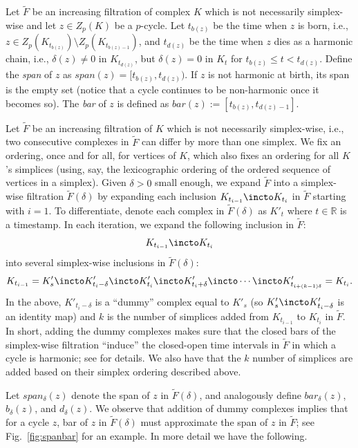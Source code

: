 \begin{definition}\label{dfn:bd-span-bar2}
Let $\tilde{F}$ be an increasing filtration of complex $K$ which is not necessarily simplex-wise and let $z \in Z_p(K)$ be a $p$-cycle. 
Let $t_{b(z)}$ be the time when $z$ is born,  i.e., $z\in Z_p(K_{t_{b(z)}})\setminus Z_p(K_{t_{b(z)-1}})$, and $t_{d(z)}$ be the time when $z$ dies as a harmonic chain, i.e., $\delta(z)\neq 0 $ in $K_{t_{d(z)}}$, but $\delta(z)=0$ in $K_t$ for $t_{b(z)} \leq t < t_{d(z)}$. Define the \emph{span} of $z$ as $span(z)=[t_{b(z)}, t_{d(z)})$.  If $z$ is not harmonic at birth, its span is the empty set (notice that a cycle  continues to be non-harmonic once it becomes so).
    The \emph{bar} of $z$ is defined as $bar(z) := [t_{b(z)}, t_{d(z)-1}]$.
\end{definition}


Let $\tilde{F}$ be an increasing filtration of $K$ which is not necessarily simplex-wise, i.e., two consecutive complexes in $\tilde{F}$ can differ by more than one simplex. We fix an ordering, once and for all, for vertices of $K$, which also fixes an ordering for all $K$'s simplices (using, say, the lexicographic ordering of the ordered sequence of vertices in a simplex). Given $\delta>0$ small enough, 
we expand $\tilde{F}$ into a simplex-wise filtration $\tilde{F}(\delta)$
by  expanding each inclusion $K_{t_{i-1}}\incto K_{t_{i}}$
in $\tilde{F}$
starting with $i=1$.
To differentiate,
 denote each complex in $\tilde{F}(\delta)$
as $K'_t$ where $t\in\mathbb{R}$ is a timestamp.
In each iteration, we expand the following inclusion in $\tilde{F}$:
$$K_{t_{i-1}} \incto K_{t_i} 
$$ 
 into  several simplex-wise inclusions in $\tilde{F}(\delta)$: 
$$  K_{t_{i-1}}=K'_{s} \incto K'_{t_i-\delta} \incto K'_{t_i}\incto K'_{t_i +\delta} \incto \cdots \incto K'_{t_{i+(k-1)\delta}} =K_{t_i}.
$$ 
In the above, $K'_{t_i-\delta}$ is a ``dummy'' complex equal to $K'_{s}$
(so $K'_{s} \incto K'_{t_i-\delta}$ is an identity map)
and $k$ is the number of simplices added from $K_{t_{i-1}}$ to $K_{t_i}$ in $\tilde{F}$.
In short, adding the dummy complexes makes sure that the closed bars of the simplex-wise filtration 
``induce''
the closed-open time intervals in $\tilde{F}$ in which a cycle is harmonic; see  for details.
We also have that the $k$ number of simplices are added based on
their simplex ordering described above.

    
Let $span_{\delta}(z)$ denote the span of $z$ in $\tilde{F}(\delta)$, and analogously define $bar_{\delta}(z)$, $b_{\delta}(z)$, and $d_{\delta}(z)$. We observe that addition of dummy complexes implies that for a cycle $z$, bar of $z$ in $\tilde{F}(\delta)$ must approximate the span of $z$ in $\tilde{F}$; see Fig.~\ref{fig:spanbar} for an example. In more detail we have the following.

